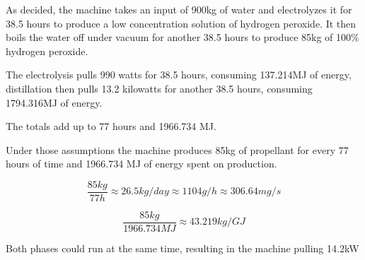 \documentclass[a4paper]{article}
\begin{document}
	As decided, the machine takes an input of 900kg of water and electrolyzes it for 38.5 hours to produce a low concentration solution of hydrogen peroxide. It then boils the water off under vacuum for another 38.5 hours to produce 85kg of 100\% hydrogen peroxide.
	
	\medskip
	
	The electrolysis pulls 990 watts for 38.5 hours, consuming 137.214MJ of energy, distillation then pulls 13.2 kilowatts for another 38.5 hours, consuming 1794.316MJ of energy.
	
	\medskip
	
	The totals add up to 77 hours and 1966.734 MJ.
	
	\medskip
	
	Under those assumptions the machine produces 85kg of propellant for every 77 hours of time and 1966.734 MJ of energy spent on production.
	
	$$ \frac{85kg}{77h} \approx 26.5kg/day \approx 1104g/h \approx 306.64mg/s$$
	
	$$ \frac{85kg}{1966.734 MJ} \approx 43.219kg/GJ$$
	
	\medskip
	
	
	
	
	Both phases could run at the same time, resulting in the machine pulling 14.2kW
	
	\normalsize
	\onecolumn
	
\end{document}
